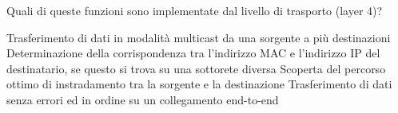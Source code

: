 \question
Quali di queste funzioni sono implementate dal livello di trasporto (layer 4)?

\begin{checkboxes}
	\choice Trasferimento di dati in modalità multicast da una sorgente a più destinazioni
	\choice Determinazione della corrispondenza tra l'indirizzo MAC e l'indirizzo IP del destinatario, se questo si trova su una sottorete diversa
	\choice Scoperta del percorso ottimo di instradamento tra la sorgente e la destinazione
	\CorrectChoice Trasferimento di dati senza errori ed in ordine su un collegamento end-to-end
\end{checkboxes}
